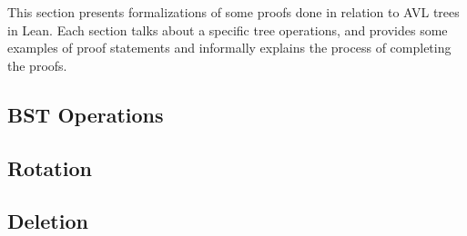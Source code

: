 This section presents formalizations of some proofs done in relation to AVL trees in Lean. Each section talks about a specific tree operations, and provides some examples of proof statements and informally explains the process of completing the proofs.

\subsection{BST Operations}


\subsection{Rotation}


% 

\subsection{Deletion}
